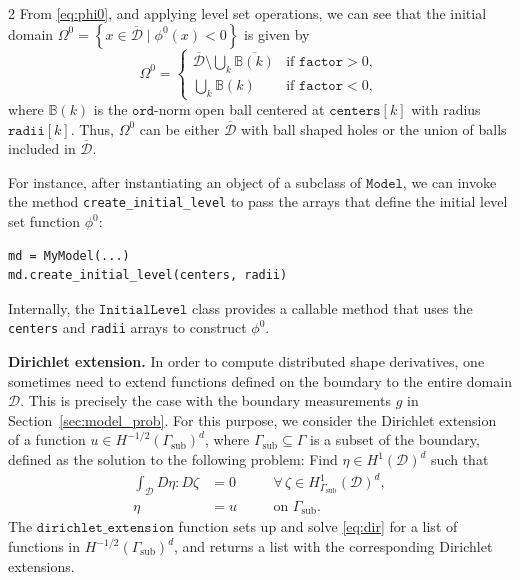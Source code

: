 \documentclass[a4paper, oneside]{article}
\newcommand{\hold}{\mathcal{D}}
\newcommand{\tred}{\textcolor{red}}
\newcommand{\code}[1]{\texttt{#1}}
\begin{document}
\begin{multicols}{2}
From \eqref{eq:phi0}, and applying level set operations,
we can see that the initial domain
$\Omega^0=  \left\{x\in\overline{\mathcal{D}}\mid \phi^0(x) < 0\right\}$ is given by
\[
\Omega^0 = 
\begin{cases}
  \overline{\mathcal{D}} \setminus \bigcup_k \overline{\mathbb{B}(k)} & \text{if } \code{factor} > 0, \\
  \bigcup_k \mathbb{B}(k) & \text{if } \code{factor} < 0,
\end{cases}
\]
where $\mathbb{B}(k)$ is the $\code{ord}$-norm open ball
centered at $\code{centers}[k]$ with radius $\code{radii}[k]$.
Thus, $\Omega^0$ can be either
$\overline{\mathcal{D}}$ with ball shaped holes
or the union of balls included in $\overline{\mathcal{D}}$.

For instance,
after instantiating an object of a subclass of $\code{Model}$,
we can invoke the method \code{create\_initial\_level} to pass
the arrays that define the initial level set function $\phi^0$:
\begin{lstlisting}
md = MyModel(...)
md.create_initial_level(centers, radii)	
\end{lstlisting}
Internally, the $\code{InitialLevel}$ class
provides a callable method that uses the
\code{centers} and \code{radii} arrays to construct $\phi^0$.

\vspace*{0.5cm}
\noindent \textbf{Dirichlet extension.}
In order to compute distributed shape derivatives, one sometimes need to extend functions defined on the boundary to the entire domain $\hold$. 
This is precisely the case with the boundary measurements $g$ in Section~\ref{sec:model_prob}. 
For this purpose, we consider the Dirichlet extension of a function $u\in H^{-1/2}(\Gamma_{\text{sub}})^{d}$,
where $\Gamma_{\text{sub}}\subseteq \Gamma$ is a subset of the boundary, defined as the solution to the following problem:
Find $\eta\in H^1(\mathcal{D})^{d}$ such that
\begin{equation} \label{eq:dir}
\begin{aligned}
	\int_{\mathcal{D}} D\eta : D\zeta &= 0 &&\quad \forall\, \zeta \in H^1_{\Gamma_{\text{sub}}}(\mathcal{D})^{d}, \\
	\eta &= u &&\quad \text{on } \Gamma_{\text{sub}}.
\end{aligned}
\end{equation}
The $\code{dirichlet\_extension}$ function 
sets up and solve \eqref{eq:dir} for a list
of functions in $H^{-1/2}(\Gamma_{\text{sub}})^{d}$, and returns
a list with the corresponding Dirichlet extensions.


\end{multicols}
\end{document}
